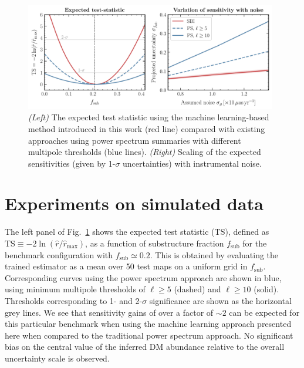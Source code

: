\documentclass[preprint]{article}
\begin{document}
\begin{figure}[!htbp]
\centering
\includegraphics[width=0.98\textwidth]{figures/results}
\caption{\emph{(Left)} The expected test statistic using the machine learning-based method introduced in this work (red line) compared with existing approaches using power spectrum summaries with different multipole thresholds (blue lines). \emph{(Right)} Scaling of the expected sensitivities (given by 1-$\sigma$ uncertainties) with instrumental noise.}
\label{fig:experiment}
\end{figure}
 

\section{Experiments on simulated data}
\label{sec:experiments}

The left panel of Fig.~\ref{fig:experiment} shows the expected test statistic (TS), defined as $\mathrm{TS} \equiv -2\ln(\hat r / \hat r_\mathrm{max})$, as a function of substructure fraction $f_\mathrm{sub}$ for the benchmark configuration with $f_\mathrm{sub} \simeq 0.2$. This is obtained by evaluating the trained estimator as a mean over 50 test maps on a uniform grid in $f_\mathrm{sub}$. Corresponding curves using the power spectrum approach are shown in blue, using minimum multipole thresholds of $\ell \geq 5$ (dashed) and $\ell \geq 10$ (solid). Thresholds corresponding to 1- and 2-$\sigma$ significance are shown as the horizontal grey lines. We see that sensitivity gains of over a factor of $\sim 2$ can be expected for this particular benchmark when using the machine learning approach presented here when compared to the traditional power spectrum approach. No significant bias on the central value of the inferred DM abundance relative to the overall uncertainty scale is observed.
\end{document}
